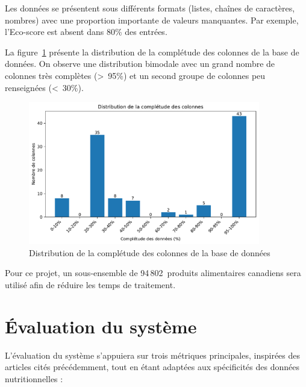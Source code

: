 \documentclass[a4paper,11pt]{article}
\begin{document}
Les données se présentent sous différents formats (listes, chaînes de caractères, nombres) avec une proportion importante de valeurs manquantes. 
Par exemple, l'Eco-score est absent dans 80\% des entrées.

La figure~\ref{fig:missing-values} présente la distribution de la complétude des colonnes de la base de données. On observe une distribution bimodale avec un grand nombre de colonnes très complètes (>~95\%) et un second groupe de colonnes peu renseignées (<~30\%).

\begin{figure}[htbp]
    \centering
    \includegraphics[width=0.9\textwidth]{figures/missing_values.pdf}
    \caption{Distribution de la complétude des colonnes de la base de données}
    \label{fig:missing-values}
\end{figure}

Pour ce projet, un sous-ensemble de 94\,802~produits alimentaires canadiens sera utilisé afin de réduire les temps de traitement.

\section{Évaluation du système}
\label{sec:evaluation}

L'évaluation du système s'appuiera sur trois métriques principales, inspirées des articles cités précédemment, tout en étant adaptées aux spécificités des données nutritionnelles :
\end{document}
